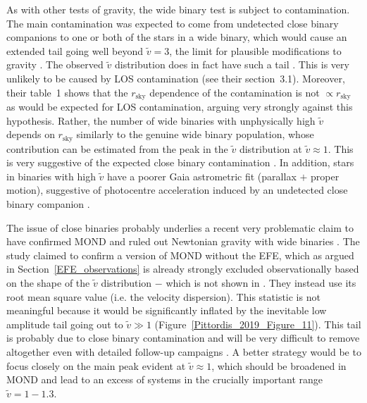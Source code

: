 \documentclass[fleqn,usenatbib,useAMS,onecolumn]{mnras} %
\begin{document}
As with other tests of gravity, the wide binary test is subject to contamination. The main contamination was expected to come from undetected close binary companions to one or both of the stars in a wide binary, which would cause an extended tail going well beyond $\widetilde{v} = 3$, the limit for plausible modifications to gravity \citep{Banik_2018_Centauri}. The observed $\widetilde{v}$ distribution does in fact have such a tail \citep{Pittordis_2019}. This is very unlikely to be caused by LOS contamination (see their section~3.1). Moreover, their table~1 shows that the $r_{\text{sky}}$ dependence of the contamination is not $\propto r_{\text{sky}}$ as would be expected for LOS contamination, arguing very strongly against this hypothesis. Rather, the number of wide binaries with unphysically high $\widetilde{v}$ depends on $r_{\text{sky}}$ similarly to the genuine wide binary population, whose contribution can be estimated from the peak in the $\widetilde{v}$ distribution at $\widetilde{v} \approx 1$. This is very suggestive of the expected close binary contamination \citep{Clarke_2020}. In addition, stars in binaries with high $\widetilde{v}$ have a poorer Gaia astrometric fit (parallax $+$ proper motion), suggestive of photocentre acceleration induced by an undetected close binary companion \citep{Belokurov_2020}.

The issue of close binaries probably underlies a recent very problematic claim to have confirmed MOND and ruled out Newtonian gravity with wide binaries \citep*{Hernandez_2022}. The study claimed to confirm a version of MOND without the EFE, which as argued in Section~\ref{EFE_observations} is already strongly excluded observationally \citep{Pittordis_2019} based on the shape of the $\widetilde{v}$ distribution $-$ which is not shown in \citet{Hernandez_2022}. They instead use its root mean square value (i.e. the velocity dispersion). This statistic is not meaningful because it would be significantly inflated by the inevitable low amplitude tail going out to $\widetilde{v} \gg 1$ (Figure~\ref{Pittordis_2019_Figure_11}). This tail is probably due to close binary contamination and will be very difficult to remove altogether even with detailed follow-up campaigns \citep[see section~8.2 of][]{Banik_2018_Centauri}. A better strategy would be to focus closely on the main peak evident at $\widetilde{v} \approx 1$, which should be broadened in MOND and lead to an excess of systems in the crucially important range $\widetilde{v} = 1-1.3$.
\end{document}
